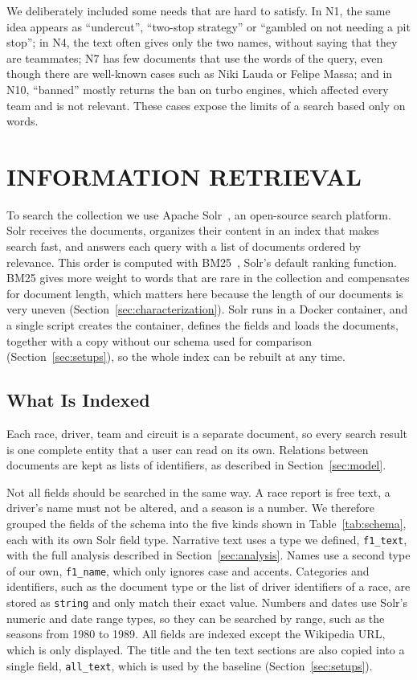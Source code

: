 \documentclass[sigconf]{acmart}
\begin{document}
We deliberately included some needs that are hard to satisfy. In N1, the same idea appears as
``undercut'', ``two-stop strategy'' or ``gambled on not needing a pit
stop''; in N4, the text often gives only the two names, without saying that
they are teammates; N7 has few documents that use the words of
the query, even though there are well-known cases such as Niki Lauda or
Felipe Massa; and in N10, ``banned'' mostly returns the ban on turbo
engines, which affected every team and is not relevant. These cases expose
the limits of a search based only on words.

\section{INFORMATION RETRIEVAL}
\label{sec:ir}
To search the collection we use Apache Solr~\cite{solr}, an open-source
search platform. Solr receives the documents, organizes their content in an
index that makes search fast, and answers each query with a list of documents
ordered by relevance. This order is computed with BM25~\cite{bm25},
Solr's default ranking function. BM25 gives more weight to words that are rare
in the collection and compensates for document length, which matters here
because the length of our documents is very uneven
(Section~\ref{sec:characterization}). Solr runs in a Docker container, and a
single script creates the container, defines the fields and loads the
documents, together with a copy without our schema used for comparison
(Section~\ref{sec:setups}), so the whole index can be rebuilt at any time.

\subsection{What Is Indexed}
\label{sec:indexing}
Each race, driver, team and circuit is a separate document, so every search
result is one complete entity that a user can read on its own. Relations
between documents are kept as lists of identifiers, as described in
Section~\ref{sec:model}.

Not all fields should be searched in the same way. A race report is free text,
a driver's name must not be altered, and a season is a number. We therefore
grouped the fields of the schema into the five kinds shown in
Table~\ref{tab:schema}, each with its own Solr field type. Narrative text uses
a type we defined, \texttt{f1\_text}, with the full analysis described in
Section~\ref{sec:analysis}. Names use a second type of our own,
\texttt{f1\_name}, which only ignores case and accents. Categories and
identifiers, such as the document type or the list of driver identifiers of a
race, are stored as \texttt{string} and only match their exact value. Numbers
and dates use Solr's numeric and date range types, so they can be searched
by range, such as the seasons from 1980 to 1989. All fields are indexed
except the Wikipedia URL, which is only displayed. The title and the ten text
sections are also copied into a single field, \texttt{all\_text}, which is
used by the baseline (Section~\ref{sec:setups}).
\end{document}
